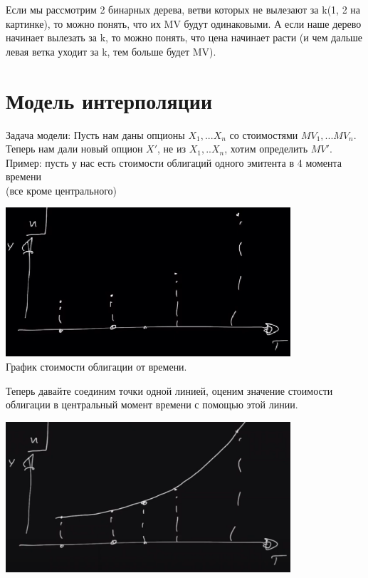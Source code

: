 \documentclass{article}
\begin{document}
Если мы рассмотрим 2 бинарных дерева, ветви которых не вылезают за k(1, 2 на картинке), то можно понять, что их MV будут одинаковыми.
А если наше дерево начинает вылезать за k, то можно понять, что цена начинает расти (и чем дальше левая ветка уходит за k, тем больше будет MV).
\newpage
\section{Модель интерполяции}
Задача модели: Пусть нам даны опционы $X_1, ... X_n$ со стоимостями $MV_1, ... MV_n$.\\
Теперь нам дали новый опцион $X'$, не из ${X_1, .. X_n}$, хотим определить $MV'$.\\
Пример: пусть у нас есть стоимости облигаций одного эмитента в 4 момента времени\\(все кроме центрального)\\
\begin{center}  
\includegraphics[width=300pt]{picture_12.png}\\
График стоимости облигации от времени.
\end{center} 

\bigskip
Теперь давайте соединим точки одной линией, оценим значение стоимости облигации в центральный момент времени с помощью этой линии.
\begin{center}  
\includegraphics[width=300pt]{picture_13.png}\\
\end{center} 
\end{document}
